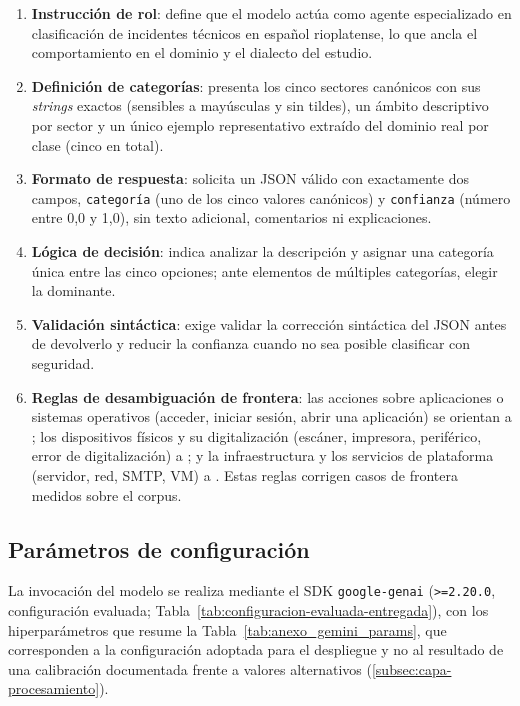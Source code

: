 \begin{enumerate}
  \item \textbf{Instrucción de rol}: define que el modelo actúa como agente especializado en clasificación de incidentes técnicos en español rioplatense, lo que ancla el comportamiento en el dominio y el dialecto del estudio.
  \item \textbf{Definición de categorías}: presenta los cinco sectores canónicos con sus \emph{strings} exactos (sensibles a mayúsculas y sin tildes), un ámbito descriptivo por sector y un único ejemplo representativo extraído del dominio real por clase (cinco en total).
  \item \textbf{Formato de respuesta}: solicita un JSON válido con exactamente dos campos, \texttt{categoría} (uno de los cinco valores canónicos) y \texttt{confianza} (número entre 0,0 y 1,0), sin texto adicional, comentarios ni explicaciones.
  \item \textbf{Lógica de decisión}: indica analizar la descripción y asignar una categoría única entre las cinco opciones; ante elementos de múltiples categorías, elegir la dominante.
  \item \textbf{Validación sintáctica}: exige validar la corrección sintáctica del JSON antes de devolverlo y reducir la confianza cuando no sea posible clasificar con seguridad.
  \item \textbf{Reglas de desambiguación de frontera}: las acciones sobre aplicaciones o sistemas operativos (acceder, iniciar sesión, abrir una aplicación) se orientan a ; los dispositivos físicos y su digitalización (escáner, impresora, periférico, error de digitalización) a ; y la infraestructura y los servicios de plataforma (servidor, red, SMTP, VM) a . Estas reglas corrigen casos de frontera medidos sobre el corpus.
\end{enumerate}

\subsection{Parámetros de configuración}\label{subsec:anexo-parametros-config}

La invocación del modelo se realiza mediante el SDK \texttt{google-genai} (\texttt{>=2.20.0}, configuración evaluada; Tabla~\ref{tab:configuracion-evaluada-entregada}), con los hiperparámetros que resume la Tabla~\ref{tab:anexo_gemini_params}, que corresponden a la configuración adoptada para el despliegue y no al resultado de una calibración documentada frente a valores alternativos (\autoref{subsec:capa-procesamiento}).

